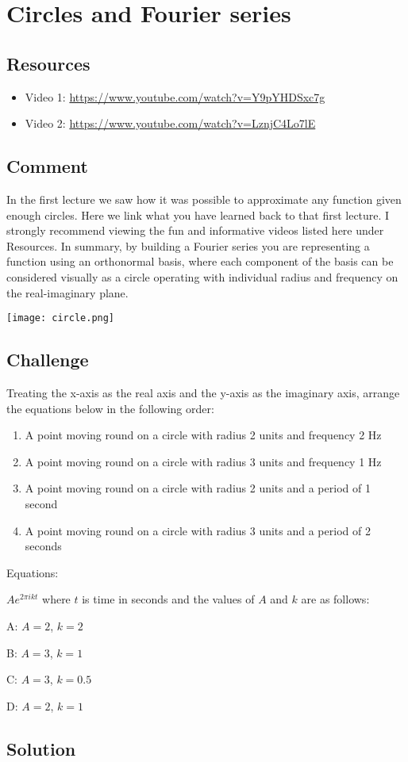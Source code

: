 \newpage
\section{Circles and Fourier series}

\subsection*{Resources}
\begin{itemize}
    \item Video 1: \url{https://www.youtube.com/watch?v=Y9pYHDSxc7g}
    \item Video 2: \url{https://www.youtube.com/watch?v=LznjC4Lo7lE}
\end{itemize}

\subsection*{Comment}
In the first lecture we saw how it was possible to approximate any function given enough circles. Here we link what you have learned back to that first lecture. I strongly recommend viewing the fun and informative videos listed here under Resources. In summary, by building a Fourier series you are representing a function using an orthonormal basis, where each component of the basis can be considered visually as a circle operating with individual radius and frequency on the real-imaginary plane.

\texttt{[image: circle.png]}

\subsection*{Challenge}
Treating the x-axis as the real axis and the y-axis as the imaginary axis, arrange the equations below in the following order:

\begin{enumerate}
    \item A point moving round on a circle with radius 2 units and frequency 2 Hz
    \item A point moving round on a circle with radius 3 units and frequency 1 Hz
    \item A point moving round on a circle with radius 2 units and a period of 1 second
    \item A point moving round on a circle with radius 3 units and a period of 2 seconds
\end{enumerate}

Equations:

$\displaystyle A e^{2 \pi i k t}$ where $t$ is time in seconds and the values of $A$ and $k$ are as follows:

A: $A=2$, $k=2$ 

B: $A=3$, $k=1$

C: $A=3$, $k=0.5$

D: $A=2$, $k=1$

\subsection*{Solution}





\fi

